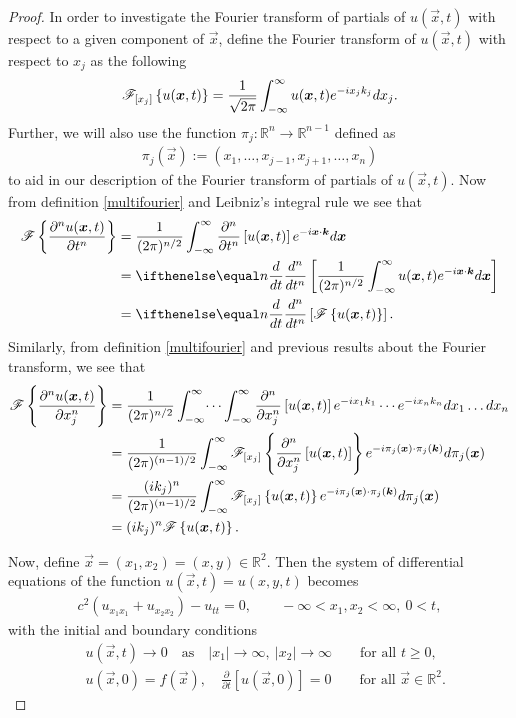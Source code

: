 \begin{proof}
  In order to investigate the Fourier transform of partials of $u(\vec{x}, t)$ with respect to a given component of $\vec{x}$, define the
  Fourier transform of $u(\vec{x}, t)$ with respect to $x_j$ as the following
  \begin{align*}
    \fourierwrt{u(\vec{x}, t)}{x_j} = \frac{1}{\sqrt{2\pi}}\int_{-\infty}^{\infty} u(\vec{x}, t) e^{-i x_jk_j }dx_j.
  \end{align*}
  Further, we will also use the function $\pi_{j}: \mathbb{R}^n \to \mathbb{R}^{n-1}$ defined as
  \begin{align*}
    \pi_{j}(\vec{x}) := (x_1, \dots, x_{j-1}, x_{j+1}, \dots, x_n)
  \end{align*}
  to aid in our description of the Fourier transform of partials of $u(\vec{x}, t)$.
  Now from definition \eqref{multifourier} and Leibniz's integral rule we see that
  \begin{align*}
    \fourier{\frac{\partial^n u(\vec{x}, t)}{\partial t^n}} &= \frac{1}{(2\pi)^{n/2}}\int_{-\infty}^\infty \frac{\partial^n }{\partial t^n}\left[u(\vec{x}, t)\right] e^{-i\vec{x}\cdot\vec{k}} d\vec{x} \\
    &= \der{t}{n}\left[\frac{1}{(2\pi)^{n/2}}\int_{-\infty}^\infty u(\vec{x}, t) e^{-i\vec{x}\cdot\vec{k}} d\vec{x} \right]\\
    &= \der{t}{n}\left[\fourier{u(\vec{x}, t)}\right].
  \end{align*}
  Similarly, from definition \eqref{multifourier} and previous results about the Fourier transform,
  we see that
  \begin{align*}
    \fourier{\frac{\partial^n u(\vec{x}, t)}{\partial x_j^n}}
    &= \frac{1}{(2\pi)^{n/2}}\int_{-\infty}^\infty \dots \int_{-\infty}^\infty\frac{\partial^n }{\partial x_j^n}\left[u(\vec{x}, t)\right] e^{-i x_1 k_1}\cdots e^{-i x_n k_n} dx_1 \dots dx_n \\
    &= \frac{1}{(2\pi)^{(n-1)/2}}\int_{-\infty}^\infty \fourierwrt{\frac{\partial^n }{\partial x_j^n}\left[u(\vec{x}, t)\right]}{x_j} e^{-i \pi_j(\vec{x}) \cdot \pi_j(\vec{k})} d\pi_j(\vec{x}) \\
    &= \frac{(ik_j)^n}{(2\pi)^{(n-1)/2}}\int_{-\infty}^\infty \fourierwrt{u(\vec{x}, t)}{x_j} e^{-i \pi_j(\vec{x}) \cdot \pi_j(\vec{k})} d\pi_j(\vec{x}) \\
    &= (ik_j)^n\fourier{u(\vec{x}, t)}.
  \end{align*}

  Now, define $\vec{x} = (x_1, x_2) = (x, y) \in\mathbb{R}^2$. Then the system of differential equations of the function
  $u(\vec{x}, t) = u(x, y, t)$ becomes
  \begin{align*}
    c^2\left(u_{x_1x_1} + u_{x_2x_2}\right) - u_{tt} = 0, \qquad -\infty < x_1, x_2 < \infty,\ 0 < t,
  \end{align*}
  with the initial and boundary conditions
  \begin{align*}
    &u(\vec{x}, t) \to 0 \quad \text{as} \quad |x_1| \to \infty,\ |x_2| \to \infty \qquad \text{for all $t\geq 0$},\\
    &u(\vec{x}, 0) = f(\vec{x}),\quad \frac{\partial}{\partial t}\left[u(\vec{x}, 0)\right]= 0 \qquad \text{for all $\vec{x}\in\mathbb{R}^2$}.
  \end{align*}


\end{proof}
